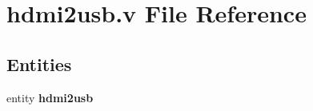 \section{hdmi2usb.\-v File Reference}
\label{hdmi2usb_8v}
\subsection*{Entities}
\begin{DoxyCompactItemize}
\item 
entity {\bf hdmi2usb}
\end{DoxyCompactItemize}

